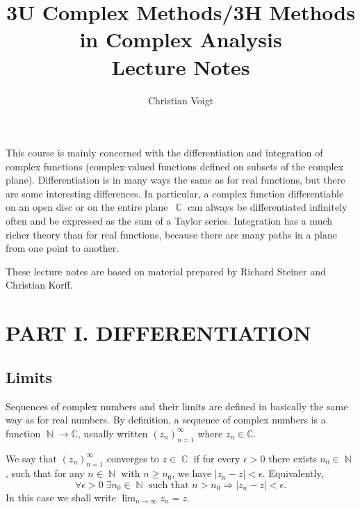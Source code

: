 \documentclass{amsproc}
\theoremstyle{definition}
\theoremstyle{remark}
\DeclareMathOperator{\N}{\mathbb{N}}
\DeclareMathOperator{\C}{\mathbb{C}}
\numberwithin{equation}{section}
\begin{document}
\title[Complex Analysis]{3U Complex Methods/3H Methods in Complex Analysis \\
Lecture Notes}
\author{Christian Voigt}


\maketitle


\vspace{2cm}

This course is mainly concerned with the differentiation and integration of complex functions (complex-valued functions defined on subsets of the complex plane). Differentiation is in many ways the same as for real functions, but there are some interesting differences. In particular, a complex function differentiable on an open disc or on the entire plane~$\C$ can always be differentiated infinitely often and be expressed as the sum of a Taylor series. Integration has a much richer theory than for real functions, because there are many paths in a plane from one point to another.

These lecture notes are based on material prepared by Richard Steiner and Christian Korff.

\vfill
\pagebreak


\section*{PART I. DIFFERENTIATION}

\subsection{Limits}

Sequences of complex numbers and their limits are defined in basically the same way as for real numbers. By definition, a sequence of complex numbers is a
function $ \N \rightarrow \mathbb{C} $, usually written $ (z_n)_{n = 1}^\infty $ where $ z_n \in \mathbb{C} $.

We say that $ (z_n)_{n = 1}^\infty $ converges to $ z \in \C $ if for every $ \epsilon > 0 $ there exists $ n_0 \in \N $, such that
for any $ n \in \N $ with $ n \geq n_0 $, we have $ |z_n - z| < \epsilon $.
Equivalently,
$$
\forall\epsilon>0\;\exists n_0 \in \N \text{ such that } n > n_0 \Rightarrow |z_n - z| < \epsilon.
$$
In this case we shall write $ \lim_{n\to\infty}z_n = z $.
\end{document}
